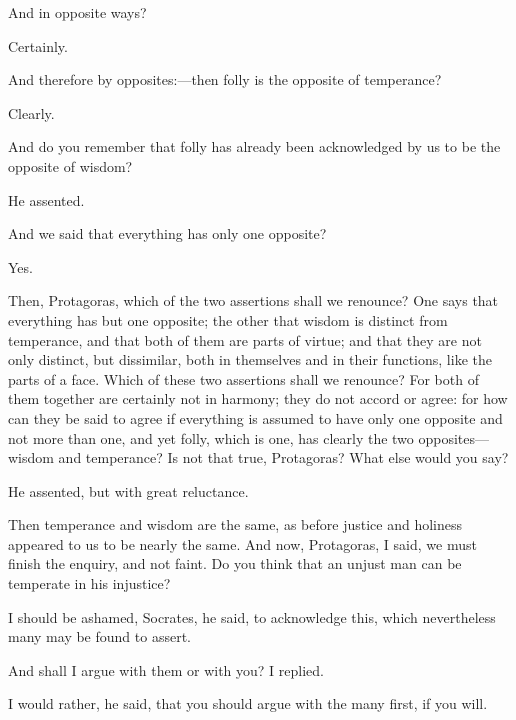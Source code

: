 \documentclass[11pt,letter]{article}
\begin{document}
\par  And in opposite ways?

\par  Certainly.

\par  And therefore by opposites:—then folly is the opposite of temperance?

\par  Clearly.

\par  And do you remember that folly has already been acknowledged by us to be the opposite of wisdom?

\par  He assented.

\par  And we said that everything has only one opposite?

\par  Yes.

\par  Then, Protagoras, which of the two assertions shall we renounce? One says that everything has but one opposite; the other that wisdom is distinct from temperance, and that both of them are parts of virtue; and that they are not only distinct, but dissimilar, both in themselves and in their functions, like the parts of a face. Which of these two assertions shall we renounce? For both of them together are certainly not in harmony; they do not accord or agree: for how can they be said to agree if everything is assumed to have only one opposite and not more than one, and yet folly, which is one, has clearly the two opposites—wisdom and temperance? Is not that true, Protagoras? What else would you say?

\par  He assented, but with great reluctance.

\par  Then temperance and wisdom are the same, as before justice and holiness appeared to us to be nearly the same. And now, Protagoras, I said, we must finish the enquiry, and not faint. Do you think that an unjust man can be temperate in his injustice?

\par  I should be ashamed, Socrates, he said, to acknowledge this, which nevertheless many may be found to assert.

\par  And shall I argue with them or with you? I replied.

\par  I would rather, he said, that you should argue with the many first, if you will.
\end{document}
